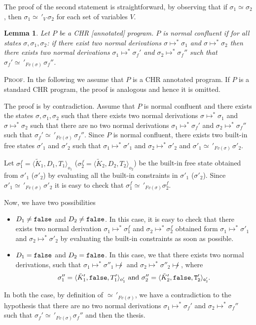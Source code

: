 \documentclass[final]{acmtrans2e}
\newtheorem{lemma}[theorem]{Lemma}
\newcommand{\la}{\langle}
\newcommand{\ra}{\rangle}
\begin{document}
The proof of the second statement is straightforward, by observing that if $\sigma_1\simeq \sigma_2$, then
$\sigma_1 \simeq\,'_{V}\,\sigma_2$ for each set of variables $V$.




\begin{lemma}\label{conflnorm}
Let $P$ be a CHR [annotated] program. $P$ is normal confluent if for all states
$\sigma, \sigma_1, \sigma_2$:
if there exist two normal derivations $\sigma\mapsto^{*} \sigma_1$ and $\sigma\mapsto^{*} \sigma_2$ then there exists two normal derivations $\sigma_1 \mapsto^{*}\sigma_f'$ and $\sigma_2\mapsto^{*}\sigma_f''$ such that $\sigma_f'\simeq\,'_{Fv(\sigma)}\,\sigma_f''$.
\end{lemma}
\textsc{Proof.}
 In the following we assume that $P$ is a CHR annotated program.
If $P$ is a standard CHR program, the proof is analogous and hence it is omitted.


The proof is by contradiction.
Assume that $P$ is normal confluent and there exists the states
$\sigma, \sigma_1, \sigma_2$ such that there exists  two normal derivations $\sigma\mapsto^{*} \sigma_1$ and $\sigma\mapsto^{*} \sigma_2$ such that there are no two normal derivations $\sigma_1 \mapsto^{*}\sigma_f'$ and $\sigma_2\mapsto^{*}\sigma_f''$ such that
$\sigma_f'\simeq\,'_{Fv(\sigma)}\,\sigma_f''$.
Since $P$ is normal confluent, there exists two built-in free states $\sigma'_1$ and $\sigma'_2$ such that $\sigma_1 \mapsto^{*}\sigma'_1$ and $\sigma_2\mapsto^{*}\sigma'_2$ and
$\sigma'_1 \simeq\,'_{Fv(\sigma)} \,\sigma'_2$.

Let $\sigma^f_1=\la\tilde K_1 , D_1, T_1\ra_{o_1}$ ($\sigma^f_2=\la\tilde K_2 , D_2, T_2\ra_{o_2}$) be the built-in free state obtained from $\sigma'_1$ ($\sigma'_2$) by evaluating all the built-in constraints in $\sigma'_1$ ($\sigma'_2$). Since $\sigma'_1\simeq\,'_{Fv(\sigma)} \,\sigma'_2$ it is easy to check that $\sigma^f_1\simeq\,'_{Fv(\sigma)} \sigma^f_2$.

Now, we have two possibilities
\begin{itemize}
  \item $D_1 \neq \tt false$ and $D_2 \neq \tt false$. In this case, it is easy to check that there exists two normal derivation $\sigma_1 \mapsto^{*}\sigma^f_1$ and $\sigma_2\mapsto^{*}\sigma^f_2$ obtained form $\sigma_1 \mapsto^{*}\sigma'_1$ and $\sigma_2\mapsto^{*}\sigma'_2$ by evaluating the built-in constraints as soon as possible.
  \item $D_1 = \tt false$ and $D_2 = \tt false$. In this case, we that there exists two normal derivations, such that $\sigma_1 \mapsto^{*}\sigma''_1\not \mapsto$ and
      $\sigma_2\mapsto^{*}\sigma''_2\not \mapsto$,
      where
      \[\sigma''_1=\la \tilde K'_1 , {\tt false} , T'_1 \ra_{o'_1} \mbox{ and }
      \sigma''_2 = \la \tilde K'_2 , \tt false , T'_2 \ra_{o'_2}.\]
 \end{itemize}
In both the case, by definition of $\simeq\,'_{Fv(\sigma)}$, we have a contradiction to the hypothesis that there are no two normal derivations $\sigma_1 \mapsto^{*}\sigma_f'$ and $\sigma_2\mapsto^{*}\sigma_f''$ such that
$\sigma_f'\simeq\,'_{Fv(\sigma)}\sigma_f''$ and then the thesis.
\end{document}
